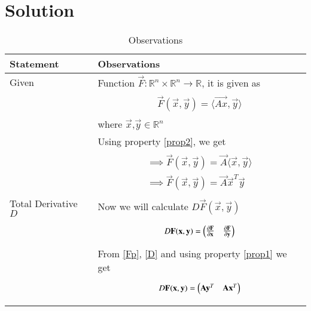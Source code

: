 \documentclass[journal,12pt]{IEEEtran}
\begin{document}
\section{\textbf{Solution}}
\renewcommand{\thetable}{2}
\begin{longtable}{|l|l|}
\hline
\endhead
\textbf{Statement}&\textbf{Observations}\\
\hline
Given&Function $\vec{F}:\mathbb{R}^n\times\mathbb{R}^n\rightarrow\mathbb{R}$, it is given as\\&\parbox{13cm}{\begin{align}
    \vec{F}(\vec{x},\vec{y})=\langle\vec{Ax},\vec{y}\rangle\label{F}
\end{align}}\\&where $\vec{x}$,$\vec{y}\in\mathbb{R}^n$\\&Using property \eqref{prop2}, we get\\&\parbox{13cm}{\begin{align}
    \implies\vec{F}(\vec{x},\vec{y})=\vec{A}\langle\vec{x},\vec{y}\rangle\\
    \implies\vec{F}(\vec{x},\vec{y})=\vec{A}\vec{x}^T\vec{y}\label{Fp}
\end{align}}\\
\hline
Total Derivative $D$&Now we will calculate $D\vec{F}(\vec{x},\vec{y})$\\&\parbox{13cm}{\begin{align}
    D\mathbf{F}(\mathbf{x},\mathbf{y})=\begin{pmatrix}\frac{\partial \mathbf{F}}{\partial \mathbf{x}}&\frac{\partial \mathbf{F}}{\partial \mathbf{y}}\end{pmatrix}\label{D}
\end{align}}\\&From \eqref{Fp}, \eqref{D} and using property \eqref{prop1} we get\\&\parbox{13cm}{\begin{align}
    D\mathbf{F}(\mathbf{x},\mathbf{y})=\begin{pmatrix}\mathbf{A}\mathbf{y}^T&\mathbf{A}\mathbf{x}^T\end{pmatrix}\label{Dsol}
\end{align}}\\
\hline
\caption{Observations}
\label{obs}
\end{longtable}
\renewcommand{\thetable}{3}
\end{document}
